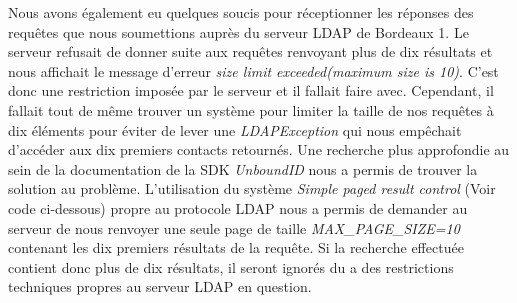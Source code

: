 Nous avons également eu quelques soucis pour réceptionner les réponses des requêtes que nous soumettions auprès du serveur LDAP de Bordeaux 1. Le serveur refusait de donner suite aux requêtes renvoyant plus de dix résultats et nous affichait le message d'erreur \textit{size limit exceeded(maximum size is 10)}. C'est donc une restriction imposée par le serveur et il fallait faire avec. Cependant, il fallait tout de même trouver un système pour limiter la taille de nos requêtes à dix éléments pour éviter de lever une \textit{LDAPException} qui nous empêchait d'accéder aux dix premiers contacts retournés. Une recherche plus approfondie au sein de la documentation de la SDK \textit{UnboundID} nous a permis de trouver la solution au problème. L'utilisation du système \emph{Simple paged result control} (Voir code ci-dessous) propre au protocole LDAP nous a permis de demander au serveur de nous renvoyer une seule page de taille \textit{MAX\_PAGE\_SIZE=10} contenant les dix premiers résultats de la requête. Si la recherche effectuée contient donc plus de dix résultats, il seront ignorés du a des restrictions techniques propres au serveur LDAP en question.

\begin{figure}[h!]
  \label{fig:simple_paged_results}
  \center
  \setlength\fboxsep{5pt}
  \setlength\fboxrule{0.5pt}
\end{figure}


